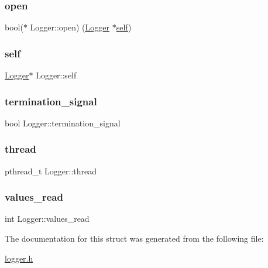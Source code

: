 \subsubsection{\texorpdfstring{open}{open}}
{\footnotesize\ttfamily bool($\ast$  Logger\+::open) (\hyperlink{structLogger}{Logger} $\ast$\hyperlink{structLogger_a220cd94b89be365dba07df9cbdf2d15f}{self})}

\mbox{\label{structLogger_a220cd94b89be365dba07df9cbdf2d15f}} 
\subsubsection{\texorpdfstring{self}{self}}
{\footnotesize\ttfamily \hyperlink{structLogger}{Logger}$\ast$ Logger\+::self}

\mbox{\label{structLogger_af3c673bf2d3f729549722c0beab4f34c}} 
\subsubsection{\texorpdfstring{termination\+\_\+signal}{termination\_signal}}
{\footnotesize\ttfamily bool Logger\+::termination\+\_\+signal}

\mbox{\label{structLogger_a69e132f8b832286f2bfd777d0a6bc266}} 
\subsubsection{\texorpdfstring{thread}{thread}}
{\footnotesize\ttfamily pthread\+\_\+t Logger\+::thread}

\mbox{\label{structLogger_aa5a4930df402c7b25487a1315b9a94f4}} 
\subsubsection{\texorpdfstring{values\+\_\+read}{values\_read}}
{\footnotesize\ttfamily int Logger\+::values\+\_\+read}



The documentation for this struct was generated from the following file\+:\begin{DoxyCompactItemize}
\item 
\hyperlink{logger_8h}{logger.\+h}\end{DoxyCompactItemize}
